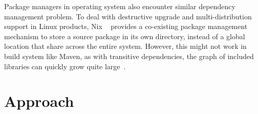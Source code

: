 Package managers in operating system also encounter similar dependency management problem. To deal with destructive upgrade and multi-distribution support in Linux products, Nix ~\cite{nix} provides a co-existing package management mechanism to store a source package in its own directory, instead of a global location that share across the entire system. However, this might not work in build system like Maven, as with transitive dependencies, the graph of included libraries can quickly grow quite large~\cite{maven:depend}. 

\section{Approach}




